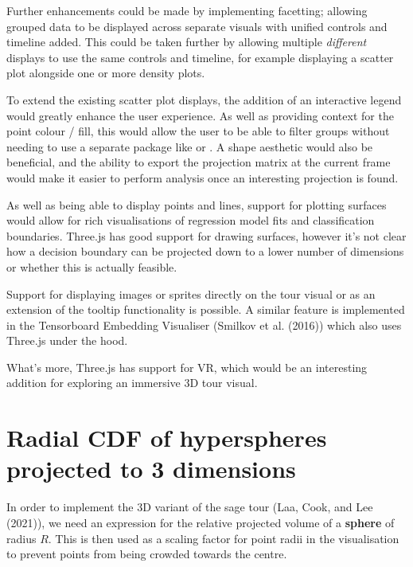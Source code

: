 Further enhancements could be made by implementing facetting; allowing grouped data to be displayed across separate visuals with unified controls and timeline added. This could be taken further by allowing multiple \emph{different} displays to use the same controls and timeline, for example displaying a scatter plot alongside one or more density plots.

To extend the existing scatter plot displays, the addition of an interactive legend would greatly enhance the user experience. As well as providing context for the point colour / fill, this would allow the user to be able to filter groups without needing to use a separate package like  or . A shape aesthetic would also be beneficial, and the ability to export the projection matrix at the current frame would make it easier to perform analysis once an interesting projection is found.

As well as being able to display points and lines, support for plotting surfaces would allow for rich visualisations of regression model fits and classification boundaries. Three.js has good support for drawing surfaces, however it's not clear how a decision boundary can be projected down to a lower number of dimensions or whether this is actually feasible.

Support for displaying images or sprites directly on the tour visual or as an extension of the tooltip functionality is possible. A similar feature is implemented in the Tensorboard Embedding Visualiser (Smilkov et al. (2016)) which also uses Three.js under the hood.

What's more, Three.js has support for VR, which would be an interesting addition for exploring an immersive 3D tour visual.

\pagebreak

\hypertarget{radial-cdf-of-hyperspheres-projected-to-3-dimensions}{%
\section{Radial CDF of hyperspheres projected to 3 dimensions}\label{radial-cdf-of-hyperspheres-projected-to-3-dimensions}}

In order to implement the 3D variant of the sage tour (Laa, Cook, and Lee (2021)), we need an expression for the relative projected volume of a \textbf{sphere} of radius \(R\). This is then used as a scaling factor for point radii in the visualisation to prevent points from being crowded towards the centre.

